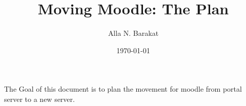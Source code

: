\title{Moving Moodle: The Plan}
\date{\today}
\author{Alla N. Barakat}
\maketitle

\section*{ }
The Goal of this document is to plan the movement for moodle from portal server to a new server.
